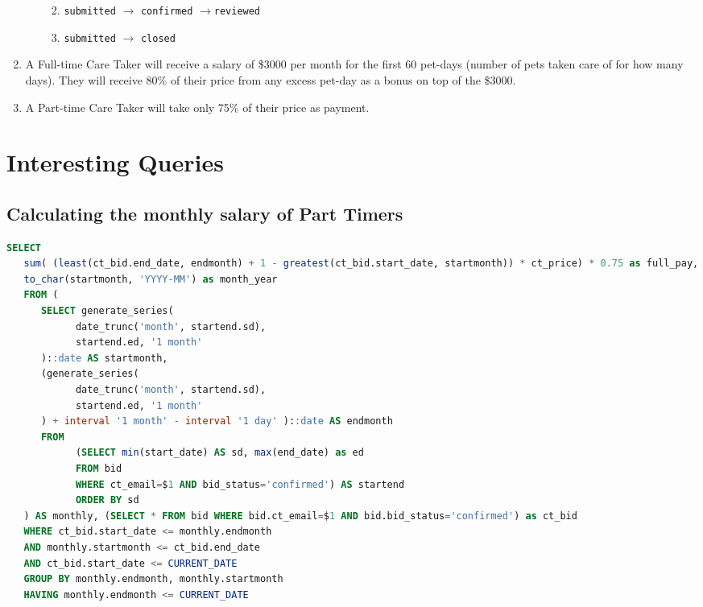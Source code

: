 \documentclass[
  paper=a4,
  ,captions=tableheading
]{scrartcl}
\newcommand{\passthrough}[1]{#1}
\providecommand{\tightlist}{%
  \setlength{\itemsep}{0pt}\setlength{\parskip}{0pt}}
\begin{document}
\begin{enumerate}
\begin{enumerate}
    \begin{enumerate}
    \def\labelenumiii{\arabic{enumiii}.}
    \tightlist
    \item
      \passthrough{\lstinline!submitted!} \(\rightarrow\)
      \passthrough{\lstinline!confirmed!}
      \(\rightarrow\)\passthrough{\lstinline!reviewed!}
    \item
      \passthrough{\lstinline!submitted!} \(\rightarrow\)
      \passthrough{\lstinline!closed!}
    \end{enumerate}
  \end{enumerate}
\item
  A Full-time Care Taker will receive a salary of \$3000 per month for
  the first 60 pet-days (number of pets taken care of for how many
  days). They will receive 80\% of their price from any excess pet-day
  as a bonus on top of the \$3000.
\item
  A Part-time Care Taker will take only 75\% of their price as payment.
\end{enumerate}

\hypertarget{interesting-queries}{%
\section{Interesting Queries}\label{interesting-queries}}

\hypertarget{calculating-the-monthly-salary-of-part-timers}{%
\subsection{Calculating the monthly salary of Part
Timers}\label{calculating-the-monthly-salary-of-part-timers}}

\begin{lstlisting}[language=SQL]
SELECT 
   sum( (least(ct_bid.end_date, endmonth) + 1 - greatest(ct_bid.start_date, startmonth)) * ct_price) * 0.75 as full_pay,
   to_char(startmonth, 'YYYY-MM') as month_year
   FROM (
      SELECT generate_series(
            date_trunc('month', startend.sd),
            startend.ed, '1 month'
      )::date AS startmonth,
      (generate_series(
            date_trunc('month', startend.sd),
            startend.ed, '1 month'
      ) + interval '1 month' - interval '1 day' )::date AS endmonth
      FROM
            (SELECT min(start_date) AS sd, max(end_date) as ed
            FROM bid 
            WHERE ct_email=$1 AND bid_status='confirmed') AS startend
            ORDER BY sd
   ) AS monthly, (SELECT * FROM bid WHERE bid.ct_email=$1 AND bid.bid_status='confirmed') as ct_bid
   WHERE ct_bid.start_date <= monthly.endmonth
   AND monthly.startmonth <= ct_bid.end_date
   AND ct_bid.start_date <= CURRENT_DATE
   GROUP BY monthly.endmonth, monthly.startmonth
   HAVING monthly.endmonth <= CURRENT_DATE
\end{lstlisting}
\end{document}
